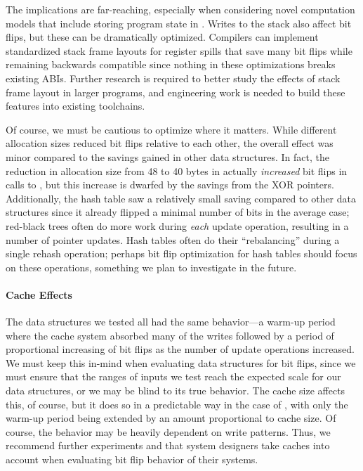 The implications are far-reaching, especially when considering novel computation
models that include storing program state in \NVM. Writes to the stack also
affect bit flips, but these can be dramatically optimized. Compilers can
implement standardized stack frame layouts for register spills that
save many bit flips while remaining backwards compatible since
nothing in these optimizations breaks existing ABIs. Further research is
required to better study the effects of stack frame layout in larger programs,
and engineering work is needed to build these features into existing toolchains.

Of course, we must be cautious to optimize where it matters. While different
allocation sizes reduced bit flips relative to each other, the overall effect
was minor compared to the savings gained in other data structures. In fact, the
reduction in allocation size from 48 to 40 bytes in \xrbt actually
\textit{increased} bit flips in calls to \malloc, but this increase is
dwarfed by the savings from the XOR pointers. Additionally, the hash table
saw a relatively small saving compared to other data structures since it
already flipped a minimal number of bits in the average case;
red-black trees often do more work during \textit{each} update operation,
resulting in a number of pointer updates. Hash tables often do their
``rebalancing'' during a single rehash operation; perhaps bit flip optimization
for hash tables should focus on these operations, something we plan to
investigate in the future.

\paragraph{Cache Effects}
The data structures we tested all had the same behavior---a warm-up period
where the cache system absorbed many of the writes followed by a period of
proportional increasing of bit flips as the number of update operations
increased. We must
keep this in-mind when evaluating data structures for bit flips, since we must
ensure that the ranges of inputs we test reach the expected scale for
our data structures, or we may be blind to its true behavior.
The cache size affects this, of course, but it does so in a predictable way in
the case of \xrbt, with only the warm-up period being extended by an amount
proportional to cache size. Of course, the behavior may be heavily dependent on write patterns.
Thus, we recommend further experiments and that system designers take caches into account when
evaluating bit flip behavior of their systems.

